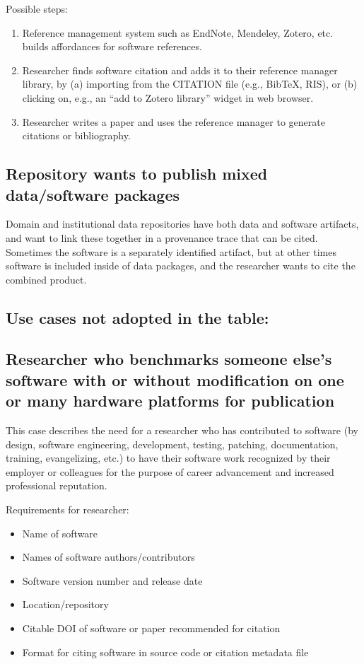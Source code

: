\documentclass[12pt, oneside]{amsart}
\begin{document}
Possible steps:
\begin{enumerate}
\item Reference management system such as EndNote, Mendeley, Zotero, etc. builds affordances for software references.
\item Researcher finds software citation and adds it to their reference manager library, by (a) importing from the CITATION file (e.g., BibTeX, RIS), or (b) clicking on, e.g., an ``add to Zotero library'' widget in web browser.
\item Researcher writes a paper and uses the reference manager to generate citations or bibliography.
\end{enumerate}

\subsection{Repository wants to publish mixed data\slash software packages}

Domain and institutional data repositories have both data and software
artifacts, and want to link these together in a provenance trace that can
be cited. Sometimes the software is a separately identified artifact, but at
other times software is included inside of data packages, and the researcher
wants to cite the combined product.

\subsection*{Use cases not adopted in the table:}

\subsection*{Researcher who benchmarks someone else's software with or without modification on one or many hardware platforms for publication}

This case describes the need for a researcher who has contributed to software (by design, software engineering, development, testing, patching, documentation, training, evangelizing, etc.) to have their software work recognized by their employer or colleagues for the purpose of career advancement and increased professional reputation.

Requirements for researcher:
\begin{itemize}
\item Name of software
\item Names of software authors/contributors
\item Software version number and release date
\item Location/repository
\item Citable DOI of software or paper recommended for citation
\item Format for citing software in source code or citation metadata file
\end{itemize}
\end{document}

